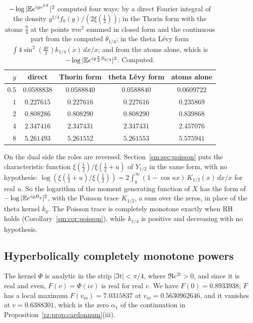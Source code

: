 \begin{table}[htbp]
\centering\small
\begin{tabular}{@{}rcccc@{}}
\toprule
$y$ & direct & Thorin form & theta L\'evy form & atoms alone\\
\midrule
$0.5$ & $0.0588838$ & $0.0588840$ & $0.0588840$ & $0.0609722$\\
$1$ & $0.227615$ & $0.227616$ & $0.227616$ & $0.235869$\\
$2$ & $0.808286$ & $0.808290$ & $0.808290$ & $0.839868$\\
$4$ & $2.347416$ & $2.347431$ & $2.347431$ & $2.457076$\\
$8$ & $5.261493$ & $5.261552$ & $5.261553$ & $5.575941$\\
\bottomrule
\end{tabular}
\caption{$-\log|\mathbb{E} e^{iye^{2X}}|^2$ computed four ways: by a direct Fourier integral of the density $y^{1/4}f_0(y)/(2\xi(\frac12))$; in the Thorin form with the atoms $\frac94$ at the points $\pi m^2$ summed in closed form and the continuous part from the computed $\theta_{1/4}$; in the theta L\'evy form $\int4\sin^2(\frac{yx}2)k_{1/4}(x)\,dx/x$; and from the atoms alone, which is $-\log|\mathbb{E} e^{iy\frac\pi2S_{9/4}}|^2$. Computed.}
\label{fm:tab:sin2}
\end{table}

On the dual side the roles are reversed. Section~\ref{sm:sec:poisson} puts the characteristic function $\xi(\frac12)/\xi(\frac12+u)$ of $Y_{1/2}$ in the same form, with no hypothesis: $\log(\xi(\frac12+u)/\xi(\frac12))=2\int_0^\infty(1-\cos ux)\,K_{1/2}(x)\,dx/x$ for real $u$. So the logarithm of the moment generating function of $X$ has the form of $-\log|\mathbb{E} e^{iyB_q}|^2$, with the Poisson trace $K_{1/2}$, a sum over the zeros, in place of the theta kernel $k_q$. The Poisson trace is completely monotone exactly when RH holds (Corollary~\ref{sm:cor:poisson}), while $k_{1/4}$ is positive and decreasing with no hypothesis.

\subsection{Hyperbolically completely monotone powers}\label{fm:sec:hcm}

The kernel $\Phi$ is analytic in the strip $|\Im t|<\pi/4$, where $\Re e^{2t}>0$, and since it is real and even, $F(v)=\Phi(iv)$ is real for real $v$. We have $F(0)=0.8933938$; $F$ has a local maximum $F(v_m)=7.0315837$ at $v_m=0.5630962646$, and it vanishes at $v=0.6388301$, which is the zero $\alpha_1$ of the continuation in Proposition~\ref{rz:prop:cardonnum}(iii).

